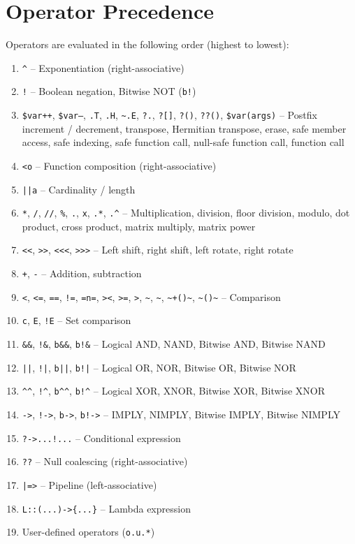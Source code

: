 \section{Operator Precedence}
Operators are evaluated in the following order (highest to lowest):
\begin{enumerate}
\item \texttt{\^{}} -- Exponentiation (right-associative)
\item \texttt{!} -- Boolean negation, Bitwise NOT (\texttt{b!})
\item \texttt{\$var++}, \texttt{\$var--}, \texttt{.T}, \texttt{.H}, \texttt{\textasciitilde.E}, \texttt{?.}, \texttt{?[]}, \texttt{?()}, \texttt{??()}, \texttt{\$var(args)} -- Postfix increment / decrement, transpose, Hermitian transpose, erase, safe member access, safe indexing, safe function call, null-safe function call, function call
\item \texttt{<o} -- Function composition (right-associative)
\item \texttt{||a} -- Cardinality / length
\item \texttt{*}, \texttt{/}, \texttt{//}, \texttt{\%}, \texttt{.}, \texttt{x}, \texttt{.*}, \texttt{.\^{}} -- Multiplication, division, floor division, modulo, dot product, cross product, matrix multiply, matrix power
\item \texttt{<<}, \texttt{>>}, \texttt{<<<}, \texttt{>>>} -- Left shift, right shift, left rotate, right rotate
\item \texttt{+}, \texttt{-} -- Addition, subtraction
\item \texttt{<}, \texttt{<=}, \texttt{==}, \texttt{!=}, \texttt{=n=}, \texttt{><}, \texttt{>=}, \texttt{>}, \texttt{\textasciitilde}, \texttt{\textasciitilde*}, \texttt{\textasciitilde+()\textasciitilde}, \texttt{\textasciitilde*()\textasciitilde} -- Comparison
\item \texttt{c}, \texttt{E}, \texttt{!E} -- Set comparison
\item \texttt{\&\&}, \texttt{!\&}, \texttt{b\&\&}, \texttt{b!\&} -- Logical AND, NAND, Bitwise AND, Bitwise NAND
\item \texttt{||}, \texttt{!|}, \texttt{b||}, \texttt{b!|} -- Logical OR, NOR, Bitwise OR, Bitwise NOR
\item \texttt{\^{}\^{}}, \texttt{!}\texttt{\^{}}, \texttt{b\^{}}\texttt{\^{}}, \texttt{b!}\texttt{\^{}} -- Logical XOR, XNOR, Bitwise XOR, Bitwise XNOR
\item \texttt{->}, \texttt{!->}, \texttt{b->}, \texttt{b!->} -- IMPLY, NIMPLY, Bitwise IMPLY, Bitwise NIMPLY
\item \texttt{?->...!...} -- Conditional expression
\item \texttt{??} -- Null coalescing (right-associative)
\item \texttt{|=>} -- Pipeline (left-associative)
\item \texttt{L::(...)->\{...\}} -- Lambda expression
\item User-defined operators (\texttt{o.u.*})
\end{enumerate}

